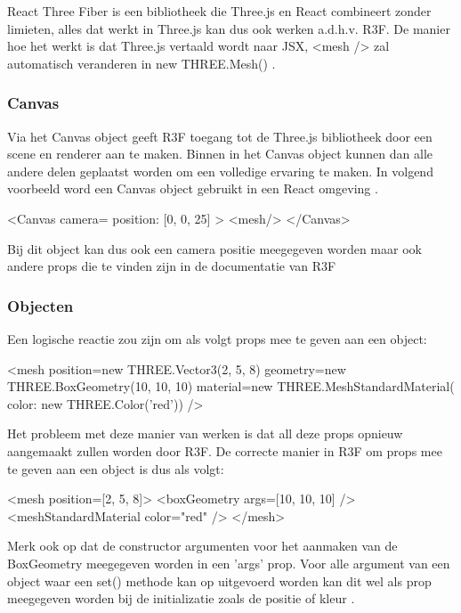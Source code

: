 React Three Fiber is een bibliotheek die Three.js en React combineert zonder limieten, alles dat werkt in Three.js kan dus ook werken a.d.h.v. R3F. De manier hoe het werkt is dat Three.js vertaald wordt naar JSX, <mesh /> zal automatisch veranderen in new THREE.Mesh() \autocite{reactThreeFiber2023}.

\subsubsection{Canvas}

Via het Canvas object geeft R3F toegang tot de Three.js bibliotheek door een scene en renderer aan te maken. Binnen in het Canvas object kunnen dan alle andere delen geplaatst worden om een volledige ervaring te maken. In volgend voorbeeld word een Canvas object gebruikt in een React omgeving \autocite{reactThreeFiber2023}.

\begin{LVerbatim}
<Canvas camera={{ position: [0, 0, 25] }} >
	<mesh/>
</Canvas>
\end{LVerbatim}

Bij dit object kan dus ook een camera positie meegegeven worden maar ook andere props die te vinden zijn in de documentatie van R3F

\subsubsection{Objecten}

Een logische reactie zou zijn om als volgt props mee te geven aan een object:

\begin{LVerbatim}
<mesh
	position={new THREE.Vector3(2, 5, 8)}
	geometry={new THREE.BoxGeometry(10, 10, 10)}
	material={new THREE.MeshStandardMaterial({ color: new THREE.Color('red')})}
/>
\end{LVerbatim}

Het probleem met deze manier van werken is dat all deze props opnieuw aangemaakt zullen worden door R3F. De correcte manier in R3F om props mee te geven aan een object is dus als volgt:

\begin{LVerbatim}
<mesh position={[2, 5, 8]}>
	<boxGeometry args={[10, 10, 10]} />
	<meshStandardMaterial color="red" />
</mesh>
\end{LVerbatim}

Merk ook op dat de constructor argumenten voor het aanmaken van de BoxGeometry meegegeven worden in een 'args' prop. Voor alle argument van een object waar een set() methode kan op uitgevoerd worden kan dit wel als prop meegegeven worden bij de initializatie zoals de positie of kleur \autocite{reactThreeFiber2023}.

